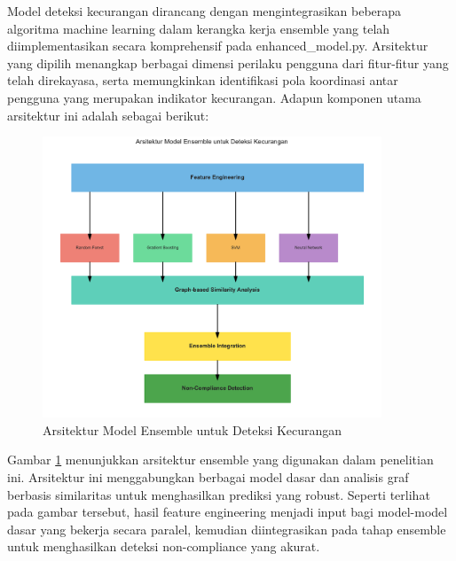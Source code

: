 Model deteksi kecurangan dirancang dengan mengintegrasikan beberapa algoritma machine learning dalam kerangka kerja ensemble yang telah diimplementasikan secara komprehensif pada enhanced\_model.py. Arsitektur yang dipilih menangkap berbagai dimensi perilaku pengguna dari fitur-fitur yang telah direkayasa, serta memungkinkan identifikasi pola koordinasi antar pengguna yang merupakan indikator kecurangan. Adapun komponen utama arsitektur ini adalah sebagai berikut:

\begin{figure}[htbp]
    \centering
    \includegraphics[width=0.9\textwidth]{figures/ensemble_architecture.pdf}
    \caption{Arsitektur Model Ensemble untuk Deteksi Kecurangan}
    \label{fig:ensemble_architecture}
\end{figure}

Gambar \ref{fig:ensemble_architecture} menunjukkan arsitektur ensemble yang digunakan dalam penelitian ini. Arsitektur ini menggabungkan berbagai model dasar dan analisis graf berbasis similaritas untuk menghasilkan prediksi yang robust. Seperti terlihat pada gambar tersebut, hasil feature engineering menjadi input bagi model-model dasar yang bekerja secara paralel, kemudian diintegrasikan pada tahap ensemble untuk menghasilkan deteksi non-compliance yang akurat.

